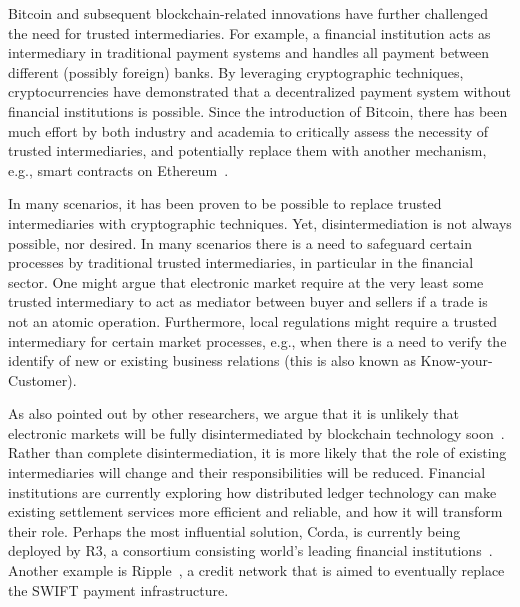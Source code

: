 Bitcoin and subsequent blockchain-related innovations have further challenged the need for trusted intermediaries.
For example, a financial institution acts as intermediary in traditional payment systems and handles all payment between different (possibly foreign) banks.
By leveraging cryptographic techniques, cryptocurrencies have demonstrated that a decentralized payment system without financial institutions is possible.
Since the introduction of Bitcoin, there has been much effort by both industry and academia to critically assess the necessity of trusted intermediaries, and potentially replace them with another mechanism, e.g., smart contracts on Ethereum~\cite{lande2018sok}.

In many scenarios, it has been proven to be possible to replace trusted intermediaries with cryptographic techniques.
Yet, disintermediation is not always possible, nor desired.
In many scenarios there is a need to safeguard certain processes by traditional trusted intermediaries, in particular in the financial sector.
One might argue that electronic market require at the very least some trusted intermediary to act as mediator between buyer and sellers if a trade is not an atomic operation.
Furthermore, local regulations might require a trusted intermediary for certain market processes, e.g., when there is a need to verify the identify of new or existing business relations (this is also known as Know-your-Customer).

As also pointed out by other researchers, we argue that it is unlikely that electronic markets will be fully disintermediated by blockchain technology soon~\cite{zamani2018little}.
Rather than complete disintermediation, it is more likely that the role of existing intermediaries will change and their responsibilities will be reduced.
Financial institutions are currently exploring how distributed ledger technology can make existing settlement services more efficient and reliable, and how it will transform their role.
Perhaps the most influential solution, Corda, is currently being deployed by R3, a consortium consisting world's leading financial institutions~\cite{brown2016introducing}.
Another example is Ripple~\cite{armknecht2015ripple}, a credit network that is aimed to eventually replace the SWIFT payment infrastructure.

